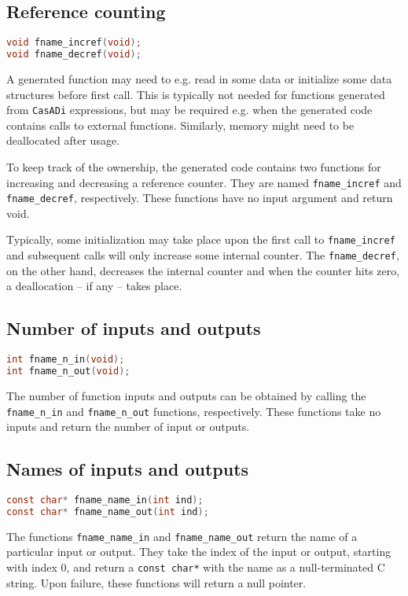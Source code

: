 \documentclass[a4paper,12pt]{book}
\newcommand{\CasADi}{\texttt{CasADi}\xspace}
\begin{document}
\subsection*{Reference counting}
\begin{lstlisting}[language=C]
void fname_incref(void);
void fname_decref(void);
\end{lstlisting}

A generated function may need to e.g. read in some data or initialize some data
structures before first call. This is typically not needed for functions generated
from \CasADi expressions, but may be required e.g. when the generated code contains
calls to external functions. Similarly, memory might need to be deallocated
after usage.

To keep track of the ownership, the generated code contains two functions for
increasing and decreasing a reference counter.
They are named \verb|fname_incref| and \verb|fname_decref|, respectively. These
functions have no input argument and return void.

Typically, some initialization may take place upon the first call to
\verb|fname_incref| and subsequent calls will only increase some internal counter.
The \verb|fname_decref|, on the other hand, decreases the internal counter and
when the counter hits zero, a deallocation -- if any -- takes place.

\subsection*{Number of inputs and outputs}
\begin{lstlisting}[language=C]
int fname_n_in(void);
int fname_n_out(void);
\end{lstlisting}

The number of function inputs and outputs can be obtained by calling the
\verb|fname_n_in| and \verb|fname_n_out| functions, respectively. These functions
take no inputs and return the number of input or outputs.

\subsection*{Names of inputs and outputs}
\begin{lstlisting}[language=C]
const char* fname_name_in(int ind);
const char* fname_name_out(int ind);
\end{lstlisting}

The functions \verb|fname_name_in| and \verb|fname_name_out| return the name
of a particular input or output. They take the index of the input or output,
starting with index 0, and return a \verb|const char*| with the name as a
null-terminated C string. Upon failure, these functions will return a null
pointer.
\end{document}
